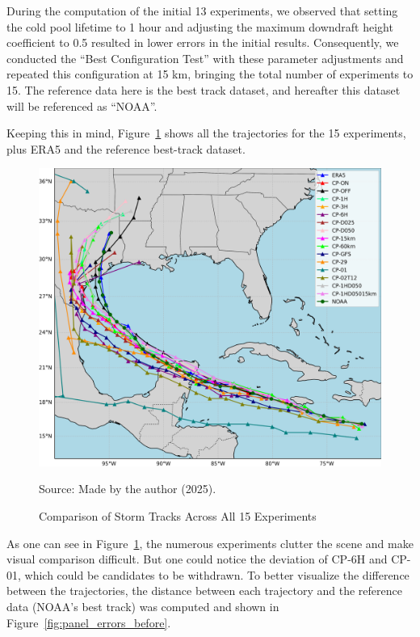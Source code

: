 During the computation of the initial 13 experiments, we observed that setting the cold pool lifetime to 1 hour and adjusting the maximum downdraft height coefficient to 0.5 resulted in lower errors in the initial results. Consequently, we conducted the “Best Configuration Test” with these parameter adjustments and repeated this configuration at 15 km, bringing the total number of experiments to 15. The reference data here is the best track dataset, and hereafter this dataset will be referenced as “NOAA”. 

Keeping this in mind, Figure~\ref{fig:all_tracks_before} shows all the trajectories for the 15 experiments, plus ERA5 and the reference best-track dataset.

\begin{figure}[!htb]
    \centering
    \caption{Comparison of Storm Tracks Across All 15 Experiments} %
    \includegraphics[width=\textwidth]{docs/figuras/chapter5/ALL_tracks_before_filter.png} %
    \vspace{0.5em}
    
    Source: Made by the author (2025). %
    \label{fig:all_tracks_before} %
\end{figure}

As one can see in Figure~\ref{fig:all_tracks_before}, the numerous experiments clutter the scene and make visual comparison difficult. But one could notice the deviation of CP-6H and CP-01, which could be candidates to be withdrawn. To better visualize the difference between the trajectories, the distance between each trajectory and the reference data (NOAA’s best track) was computed and shown in Figure~\ref{fig:panel_errors_before}.


